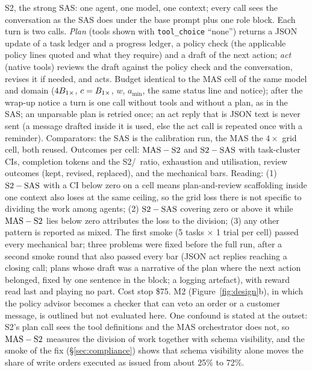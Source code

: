 S2, the strong SAS: one agent, one model, one context; every call sees the conversation as the SAS does under the base prompt plus one role block. Each turn is two calls. \emph{Plan} (tools shown with \texttt{tool\_choice} ``none'') returns a JSON update of a task ledger and a progress ledger, a policy check (the applicable policy lines quoted and what they require) and a draft of the next action; \emph{act} (native tools) reviews the draft against the policy check and the conversation, revises it if needed, and acts. Budget identical to the MAS cell of the same model and domain ($4B_{1\times}$, $c = B_{1\times}$, $w$, $a_{\min}$, the same status line and notice); after the wrap-up notice a turn is one call without tools and without a plan, as in the SAS; an unparsable plan is retried once; an act reply that is JSON text is never sent (a message drafted inside it is used, else the act call is repeated once with a reminder). Comparators: the SAS is the calibration run, the MAS the $4\times$ grid cell, both reused. Outcomes per cell: $\text{\textup{MAS}} - \text{S2}$ and $\text{S2} - \text{\textup{SAS}}$ with task-cluster CIs, completion tokens and the S2/\Sone\ ratio, exhaustion and utilisation, review outcomes (kept, revised, replaced), and the mechanical bars. Reading: (1) $\text{S2} - \text{\textup{SAS}}$ with a CI below zero on a cell means plan-and-review scaffolding inside one context also loses at the same ceiling, so the grid loss there is not specific to dividing the work among agents; (2) $\text{S2} - \text{\textup{SAS}}$ covering zero or above it while $\text{\textup{MAS}} - \text{S2}$ lies below zero attributes the loss to the division; (3) any other pattern is reported as mixed. The first smoke (5 tasks $\times$ 1 trial per cell) passed every mechanical bar; three problems were fixed before the full run, after a second smoke round that also passed every bar (JSON act replies reaching a closing call; plans whose draft was a narrative of the plan where the next action belonged, fixed by one sentence in the block; a logging artefact), with reward read last and playing no part. Cost stop \$75. M2 (Figure~\ref{fig:design}b), in which the policy advisor becomes a checker that can veto an order or a customer message, is outlined but not evaluated here. One confound is stated at the outset: S2's plan call sees the tool definitions and the MAS orchestrator does not, so $\text{\textup{MAS}} - \text{S2}$ measures the division of work together with schema visibility, and the smoke of the fix (\S\ref{sec:compliance}) shows that schema visibility alone moves the share of write orders executed as issued from about 25\% to 72\%.

